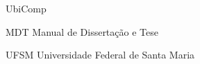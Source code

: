 \begin{listofabbrv}{UbiComp}
	

	  \item [MDT]       Manual de Dissertação e Tese
	  \item [UFSM]      Universidade Federal de Santa Maria


\end{listofabbrv}